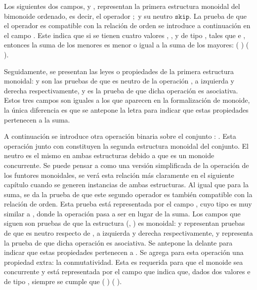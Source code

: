 Los siguientes dos campos,  y , representan la primera estructura monoidal del bimonoide ordenado, es decir, el operador $;$ y su neutro $\mathtt{skip}$. La prueba de que el operador es compatible con la relación de orden se introduce a continuación en el campo . Este indica que si se tienen cuatro valores , ,  y  de tipo , tales que    e   , entonces la suma de los menores es menor o igual a la suma de los mayores: (  )  (  ). 

Seguidamente, se presentan las leyes o propiedades de la primera estructura monoidal:  y  son las pruebas de que  es neutro de la operación , a izquierda y derecha respectivamente, y  es la prueba de que dicha operación es asociativa. Estos tres campos son iguales a los que aparecen en la formalización de monoide, la única diferencia es que se antepone la letra  para indicar que estas propiedades pertenecen a la suma. 

A continuación se introduce otra operación binaria sobre el conjunto : . Esta operación junto con  constituyen la segunda estructura monoidal del conjunto. El neutro es el mismo en ambas estructuras debido a que es un monoide concurrente. Se puede pensar a  como una versión simplificada de la operación  de los funtores monoidales, se verá esta relación más claramente en el siguiente capítulo cuando se generen instancias de ambas estructuras. Al igual que para la suma, se da la prueba de que este segundo operador es también compatible con la relación de orden. Esta prueba está representada por el campo , cuyo tipo es muy similar a , donde la operación pasa a ser  en lugar de la suma. Los campos que siguen son pruebas de que la estructura (, ) es monoidal:  y  representan pruebas de que  es neutro respecto de , a izquierda y derecha respectivamente, y  representa la prueba de que dicha operación es asociativa. Se antepone la  delante para indicar que estas propiedades pertenecen a . Se agrega para esta operación una propiedad extra: la conmutatividad. Esta es requerida para que el monoide sea concurrente y está representada por el campo  que indica que, dados dos valores  e  de tipo , siempre se cumple que ( )  ( ).

